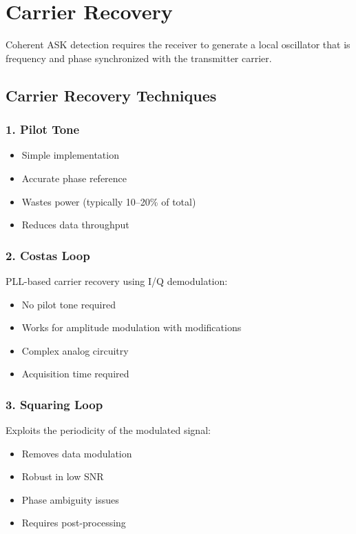 \section{Carrier Recovery}

Coherent ASK detection requires the receiver to generate a local oscillator that is frequency and phase synchronized with the transmitter carrier.

\subsection{Carrier Recovery Techniques}

\subsubsection{1. Pilot Tone}
\begin{itemize}
\item[\checkmark] Simple implementation
\item[\checkmark] Accurate phase reference
\item[\texttimes] Wastes power (typically 10--20\% of total)
\item[\texttimes] Reduces data throughput
\end{itemize}

\subsubsection{2. Costas Loop}
PLL-based carrier recovery using I/Q demodulation:
\begin{itemize}
\item[\checkmark] No pilot tone required
\item[\checkmark] Works for amplitude modulation with modifications
\item[\texttimes] Complex analog circuitry
\item[\texttimes] Acquisition time required
\end{itemize}

\subsubsection{3. Squaring Loop}
Exploits the periodicity of the modulated signal:
\begin{itemize}
\item[\checkmark] Removes data modulation
\item[\checkmark] Robust in low SNR
\item[\texttimes] Phase ambiguity issues
\item[\texttimes] Requires post-processing
\end{itemize}

